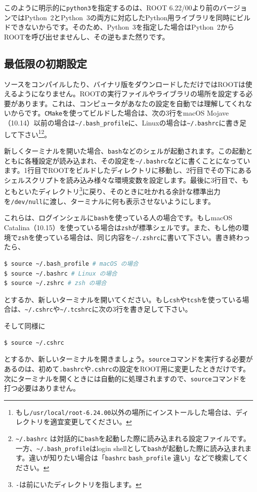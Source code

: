 {このように明示的に\texttt{python3}を指定するのは、ROOT 6.22/00より前のバージョンではPython~2とPython~3の両方に対応したPython用ライブラリを同時にビルドできないからです。そのため、Python~3を指定した場合はPython~2からROOTを呼び出せませんし、その逆もまた然りです。

\subsection{最低限の初期設定}
\label{subsec:settings}
ソースをコンパイルしたり、バイナリ版をダウンロードしただけではROOTは使えるようになりません。ROOTの実行ファイルやライブラリの場所を設定する必要があります。これは、コンピュータがあなたの設定を自動では理解してくれないからです。\texttt{CMake}を使ってビルドした場合は、次の3行をmacOS Mojave（10.14）以前の場合は\texttt{\~{}/.bash\_profile}に、Linuxの場合は\texttt{\~{}/.bashrc}に書き足して下さい\footnote{もし\texttt{/usr/local/root-6.24.00}以外の場所にインストールした場合は、ディレクトリを適宜変更してください。}\footnote{\texttt{\~{}/.bashrc} は対話的に\texttt{bash}を起動した際に読み込まれる設定ファイルです。一方、\texttt{\~{}/.bash\_profile}はlogin shellとして\texttt{bash}が起動した際に読み込まれます。違いが知りたい場合は「\texttt{bashrc} \texttt{bash\_profile} 違い」などで検索してください。}。
\begin{NoFloat}

\end{NoFloat}

新しくターミナルを開いた場合、\texttt{bash}などのシェルが起動されます。この起動とともに各種設定が読み込まれ、その設定を\texttt{\~{}/.bashrc}などに書くことになっています。1行目でROOTをビルドしたディレクトリに移動し、2行目でその下にあるシェルスクリプトを読み込み様々な環境変数を設定します。最後に3行目で、もともといたディレクトリ\footnote{\texttt{-}は前にいたディレクトリを指します。}に戻り、そのときに吐かれる余計な標準出力を\texttt{/dev/null}に渡し、ターミナルに何も表示させないようにします。

これらは、ログインシェルに\texttt{bash}を使っている人の場合です。もしmacOS Catalina（10.15）を使っている場合は\texttt{zsh}が標準シェルです。また、もし他の環境で\texttt{zsh}を使っている場合は、同じ内容を\texttt{\~{}/.zshrc}に書いて下さい。書き終わったら、
\begin{lstlisting}[language=bash]
$ source ~/.bash_profile # macOS の場合
$ source ~/.bashrc # Linux の場合
$ source ~/.zshrc # zsh の場合
\end{lstlisting}
とするか、新しいターミナルを開いてください。もし\texttt{csh}や\texttt{tcsh}を使っている場合は、\texttt{\~{}/.cshrc}や\texttt{\~{}/.tcshrc}に次の3行を書き足して下さい。
\begin{NoFloat}

\end{NoFloat}
そして同様に
\begin{lstlisting}[language=bash]
$ source ~/.cshrc
\end{lstlisting}
とするか、新しいターミナルを開きましょう。\texttt{source}コマンドを実行する必要があるのは、初めて\texttt{.bashrc}や\texttt{.cshrc}の設定をROOT用に変更したときだけです。次にターミナルを開くときには自動的に処理されますので、\texttt{source}コマンドを打つ必要はありません。

}
